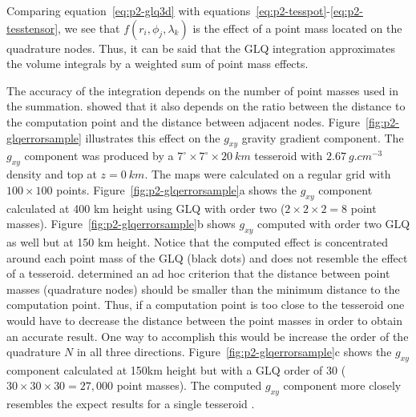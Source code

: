 Comparing equation~\ref{eq:p2-glq3d} with
equations~\ref{eq:p2-tesspot}-\ref{eq:p2-tesstensor},
we see that $f(r_i, \phi_j, \lambda_k)$ is the effect of a point
mass located on the quadrature nodes.
Thus, it can be said that the GLQ integration
approximates the volume integrals  by a
weighted sum of point mass effects.

The accuracy of the integration
depends on the number of point masses used in the summation.
\citet{ku1977} showed that it also depends on the ratio between
the distance to the computation point and the distance between adjacent nodes.
Figure~\ref{fig:p2-glqerrorsample}
illustrates this effect on the $g_{xy}$ gravity gradient component.
The $g_{xy}$ component was produced by a
$7^\circ \times 7^\circ \times 20\ km$ tesseroid
with $2.67\ g.cm^{-3}$ density
and top at $z=0\ km$.
The maps were calculated on a regular grid
with $100\times100$ points.
Figure~\ref{fig:p2-glqerrorsample}a shows the $g_{xy}$ component
calculated at 400 km height using
GLQ with order two ($2 \times 2 \times 2 = 8$ point masses).
Figure~\ref{fig:p2-glqerrorsample}b shows $g_{xy}$ computed with order two
GLQ as well but at 150 km height.
Notice that the computed effect is concentrated around each point mass
of the GLQ (black dots) and does not resemble the effect of a tesseroid.
\citet{ku1977} determined an ad hoc criterion that the distance between
point masses (quadrature nodes) should be smaller than the minimum distance to
the computation point.
Thus, if a computation point is too close to the tesseroid one would have to
decrease the distance between the point masses in order to obtain an accurate
result.
One way to accomplish this would be increase the order of the quadrature
$N$ in all three directions.
Figure~\ref{fig:p2-glqerrorsample}c shows the $g_{xy}$ component calculated at
150km height but with a GLQ order of 30
($30 \times 30 \times 30 = 27,000$ point masses).
The computed $g_{xy}$ component more closely resembles
the expect results for a single tesseroid \citep{asgharzadeh2007}.

